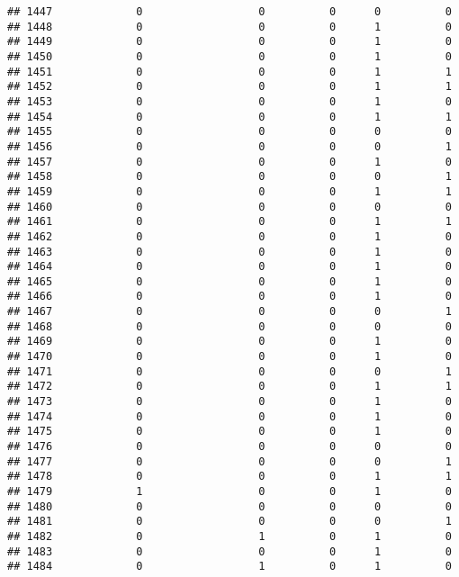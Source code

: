 \documentclass[
]{article}
\begin{document}
\begin{verbatim}
## 1447             0                  0          0      0          0
## 1448             0                  0          0      1          0
## 1449             0                  0          0      1          0
## 1450             0                  0          0      1          0
## 1451             0                  0          0      1          1
## 1452             0                  0          0      1          1
## 1453             0                  0          0      1          0
## 1454             0                  0          0      1          1
## 1455             0                  0          0      0          0
## 1456             0                  0          0      0          1
## 1457             0                  0          0      1          0
## 1458             0                  0          0      0          1
## 1459             0                  0          0      1          1
## 1460             0                  0          0      0          0
## 1461             0                  0          0      1          1
## 1462             0                  0          0      1          0
## 1463             0                  0          0      1          0
## 1464             0                  0          0      1          0
## 1465             0                  0          0      1          0
## 1466             0                  0          0      1          0
## 1467             0                  0          0      0          1
## 1468             0                  0          0      0          0
## 1469             0                  0          0      1          0
## 1470             0                  0          0      1          0
## 1471             0                  0          0      0          1
## 1472             0                  0          0      1          1
## 1473             0                  0          0      1          0
## 1474             0                  0          0      1          0
## 1475             0                  0          0      1          0
## 1476             0                  0          0      0          0
## 1477             0                  0          0      0          1
## 1478             0                  0          0      1          1
## 1479             1                  0          0      1          0
## 1480             0                  0          0      0          0
## 1481             0                  0          0      0          1
## 1482             0                  1          0      1          0
## 1483             0                  0          0      1          0
## 1484             0                  1          0      1          0

\end{verbatim}
\end{document}
